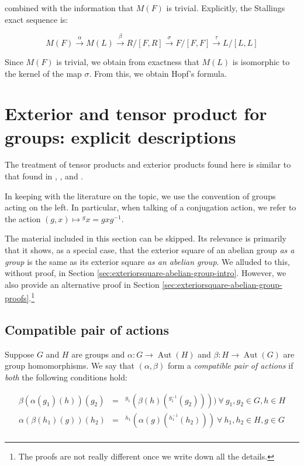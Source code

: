 combined with the information that $M(F)$ is trivial. Explicitly,
the Stallings exact sequence is:

$$M(F) \stackrel{\alpha}{\to} M(L) \stackrel{\beta}{\to} R/[F,R] \stackrel{\sigma}{\to} F/[F,F] \stackrel{\tau}{\to} L/[L,L]$$

Since $M(F)$ is trivial, we obtain from exactness that $M(L)$ is
isomorphic to the kernel of the map $\sigma$. From this, we obtain
Hopf's formula.


\section{Exterior and tensor product for groups: explicit descriptions}\label{sec:exterior-and-tensor-product}

The treatment of tensor products and exterior products found here is
similar to that found in \cite{BrownLoday}, \cite{McDermottThesis},
and \cite{Ellis87}.

In keeping with the literature on the topic, we use the convention of
groups acting on the left. In particular, when talking of a
conjugation action, we refer to the action $(g,x) \mapsto {}^gx = gxg^{-1}$.

The material included in this section can be skipped. Its relevance is
primarily that it shows, as a special case, that the exterior square
of an abelian group {\em as a group} is the same as its exterior
square {\em as an abelian group}. We alluded to this, without proof,
in Section \ref{sec:exteriorsquare-abelian-group-intro}. However, we
also provide an alternative proof in Section
\ref{sec:exteriorsquare-abelian-group-proofs}.\footnote{The proofs are
  not really different once we write down all the details.}

\subsection{Compatible pair of actions}

Suppose $G$ and $H$ are groups and $\alpha: G \to
\operatorname{Aut}(H)$ and $\beta: H \to \operatorname{Aut}(G)$ are
group homomorphisms. We say that $(\alpha,\beta)$ form a {\em
  compatible pair of actions} if {\em both} the following conditions
hold:

\begin{eqnarray*}
  \beta(\alpha(g_1)(h))(g_2) & = & {}^{g_1}(\beta(h)({}^{g_1^{-1}}(g_2)))) \ \forall \ g_1,g_2 \in G, h \in H\\
  \alpha(\beta(h_1)(g))(h_2) & = & {}^{h_1}(\alpha(g)({}^{h_1^{-1}}(h_2))) \ \forall \ h_1,h_2 \in H, g \in G\\
\end{eqnarray*}

